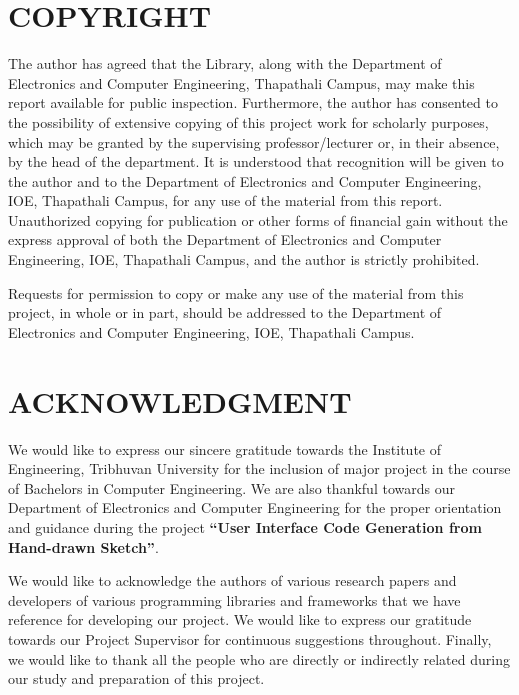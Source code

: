 \section*{COPYRIGHT}
    The author has agreed that the Library, along with the Department of Electronics and Computer Engineering, Thapathali Campus, may make this report available for public inspection. Furthermore, the author has consented to the possibility of extensive copying of this project work for scholarly purposes, which may be granted by the supervising professor/lecturer or, in their absence, by the head of the department. It is understood that recognition will be given to the author and to the Department of Electronics and Computer Engineering, IOE, Thapathali Campus, for any use of the material from this report. Unauthorized copying for publication or other forms of financial gain without the express approval of both the Department of Electronics and Computer Engineering, IOE, Thapathali Campus, and the author is strictly prohibited.

    Requests for permission to copy or make any use of the material from this project, in whole or in part, should be addressed to the Department of Electronics and Computer Engineering, IOE, Thapathali Campus.

    \pagebreak

\section*{ACKNOWLEDGMENT}

We would like to express our sincere gratitude towards the Institute of Engineering,
Tribhuvan University for the inclusion of major project in the course of Bachelors in
Computer Engineering. We are also thankful towards our Department of Electronics
and Computer Engineering for the proper orientation and guidance during the project
\textbf{“User Interface Code Generation from Hand-drawn Sketch”}.

We would like to acknowledge the authors of various research papers and developers
of various programming libraries and frameworks that we have reference for
developing our project.
We would like to express our gratitude towards our Project Supervisor \textbf{\supervisorname} for continuous suggestions throughout.
Finally, we would like to thank all the people who are directly or indirectly related
during our study and preparation of this project.

